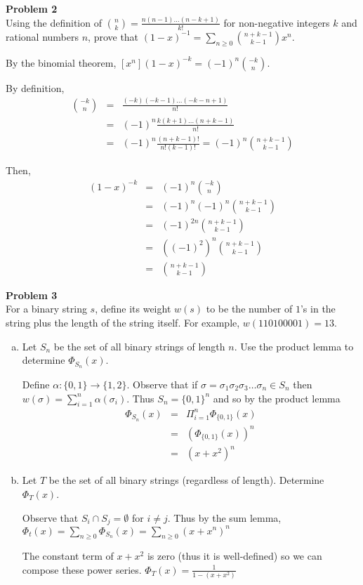\documentclass{article}
\begin{document}
\textbf{Problem 2} \\

Using the definition of $\binom nk = \frac{n(n-1) \dots (n-k+1)}{k!}$ for non-negative integers $k$ and rational numbers $n$, prove that $(1-x)^{-1} = \sum_{n \ge 0} \binom {n+k-1}{k-1}x^n$.

By the binomial theorem, $[x^n](1-x)^{-k} = (-1)^n \binom {-k}n$.

By definition, 
\begin{eqnarray*}
	\binom {-k}n &=& \frac{(-k)(-k-1) \dots (-k-n+1)}{n!} \\
	&=& (-1)^n \frac{k(k+1) \dots (n+k-1)}{n!} \\
	&=& (-1)^n \frac{(n+k-1)!}{n!(k-1)!} = (-1)^n \binom {n+k-1}{k-1}
\end{eqnarray*}

Then, 
\begin{eqnarray*}
	[x^n](1-x)^{-k} &=&  (-1)^n \binom {-k}{n} \\
	&=&  (-1)^n(-1)^n \binom {n+k-1}{k-1} \\
	&=& (-1)^{2n} \binom {n+k-1}{k-1}  \\
	&=&  \left( (-1)^2 \right)^n   \binom {n+k-1}{k-1} \\
	&=& \binom {n+k-1}{k-1} 
\end{eqnarray*}

\textbf{Problem 3}\\
For a binary string $s$, define its weight $w(s)$ to be the number of $1$'s in the string plus the length of the string itself. For example, $w(110100001)=13$.

\begin{enumerate}[a)]
	\item Let $S_n$ be the set of all binary strings of length $n$. Use the product lemma to determine $\Phi_{S_n}(x)$.
	
	Define $\alpha : \{0,1\} \rightarrow \{1,2\}$. Observe that if $\sigma = \sigma_1 \sigma_2 \sigma_3 \dots \sigma_n \in S_n$ then $w(\sigma) = \sum_{i=1}^{n}\alpha (\sigma_i)$. Thus $S_n = \{0,1\}^n$ and so by the product lemma 
	\begin{eqnarray*}
		\Phi_{S_n}(x) &=& \Pi_{i=1}^n \Phi_{\{0,1\}}(x) \\
		&=& \left( \Phi_{\{0,1 \}}(x) \right)^n \\
		&=& (x+x^2)^n
	\end{eqnarray*}
	
	\item Let $T$ be the set of all binary strings (regardless of length). Determine $\Phi_T(x)$.
	
	Observe that $S_i \cap S_j = \emptyset$ for $i \neq j$. Thus by the sum lemma, $\Phi_t(x) = \sum_{n \ge 0}\Phi_{S_n}(x) = \sum_{n \ge 0}(x+x^n)^n$
	
	The constant term of $x+x^2$ is zero (thus it is well-defined) so we can compose these power series.
	$\Phi_T(x) = \frac{1}{1-(x+x^2)}$
\end{enumerate}
\end{document}
